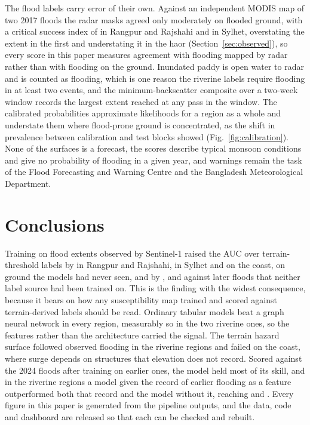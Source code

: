 The flood labels carry error of their own. Against an independent MODIS map of two 2017 floods the radar masks agreed only moderately on flooded ground, with a critical success index of \RRXcCSI{} in Rangpur and Rajshahi and \SylhetXcCSI{} in Sylhet, overstating the extent in the first and understating it in the haor (Section~\ref{sec:observed}), so every score in this paper measures agreement with flooding mapped by radar rather than with flooding on the ground. Inundated paddy is open water to radar and is counted as flooding, which is one reason the riverine labels require flooding in at least two events, and the minimum-backscatter composite over a two-week window records the largest extent reached at any pass in the window. The calibrated probabilities approximate likelihoods for a region as a whole and understate them where flood-prone ground is concentrated, as the shift in prevalence between calibration and test blocks showed (Fig.~\ref{fig:calibration}). None of the surfaces is a forecast, the scores describe typical monsoon conditions and give no probability of flooding in a given year, and warnings remain the task of the Flood Forecasting and Warning Centre and the Bangladesh Meteorological Department.

\section{Conclusions}
\label{sec:conclusions}

Training on flood extents observed by Sentinel-1 raised the AUC over terrain-threshold labels by \RRLabelGap{} in Rangpur and Rajshahi, \SylhetLabelGap{} in Sylhet and \CoastalLabelGap{} on the coast, on ground the models had never seen, and by \RRTempProxyGap{}, \SylhetTempProxyGap{} and \CoastalTempProxyGap{} against later floods that neither label source had been trained on. This is the finding with the widest consequence, because it bears on how any susceptibility map trained and scored against terrain-derived labels should be read. Ordinary tabular models beat a graph neural network in every region, measurably so in the two riverine ones, so the features rather than the architecture carried the signal. The terrain hazard surface followed observed flooding in the riverine regions and failed on the coast, where surge depends on structures that elevation does not record. Scored against the 2024 floods after training on earlier ones, the model held most of its skill, and in the riverine regions a model given the record of earlier flooding as a feature outperformed both that record and the model without it, reaching \RRPastFeatAUC{} and \SylhetPastFeatAUC{}. Every figure in this paper is generated from the pipeline outputs, and the data, code and dashboard are released so that each can be checked and rebuilt.

